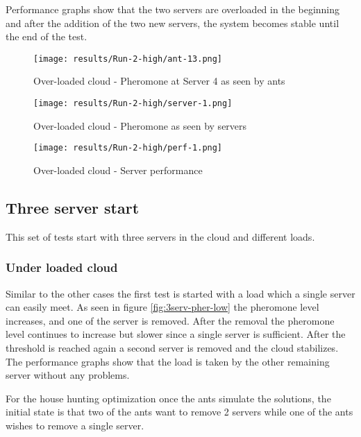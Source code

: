 Performance graphs show that the two servers are overloaded in the beginning and after the addition of the two new servers, the system becomes stable until the end of the test.

\begin{figure}
	\centering
		\texttt{[image: results/Run-2-high/ant-13.png]}
	\caption{Over-loaded cloud - Pheromone at Server 4 as seen by ants}
	\label{fig:2serv-ant13-high}
\end{figure}

\begin{figure}
	\centering
		\texttt{[image: results/Run-2-high/server-1.png]}
	\caption{Over-loaded cloud - Pheromone as seen by servers}
	\label{fig:2serv-pher-high}
\end{figure}

\begin{figure}
	\centering
		\texttt{[image: results/Run-2-high/perf-1.png]}
	\caption{Over-loaded cloud - Server performance}
	\label{fig:2serv-perf-high}
\end{figure}

\subsection{Three server start}

This set of tests start with three servers in the cloud and different loads.

\subsubsection{Under loaded cloud}

Similar to the other cases the first test is started with a load which a single server can easily meet. As seen in figure \ref{fig:3serv-pher-low} the pheromone level increases, and one of the server is removed. After the removal the pheromone level continues to increase but slower since a single server is sufficient. After the threshold is reached again a second server is removed and the cloud stabilizes. The performance graphs show that the load is taken by the other remaining server without any problems.

For the house hunting optimization once the ants simulate the solutions, the initial state is that two of the ants want to remove 2 servers while one of the ants wishes to remove a single server.

